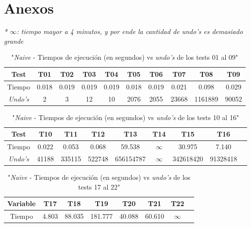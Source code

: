 \documentclass[12pt]{article}
\begin{document}
\section*{Anexos}

\textit{* $\infty$: tiempo mayor a 4 minutos, y por ende la cantidad de undo's es demasiado grande} \\

\begin{center}
    \begin{table}[h]
        \caption{"\textit{Naive} - Tiempos de ejecución (en segundos) vs \textit{undo's} de los tests 01 al 09"}
        \centering
        \begin{tabular} {| c | c | c | c | c | c | c | c | c | c |}
            \hline
            Test & T01 & T02 & T03 & T04 & T05 & T06 & T07 & T08 & T09 \\
            \hline
            Tiempo & 0.018 & 0.019 & 0.019 & 0.019 & 0.018 & 0.019 & 0.021 & 0.098 & 0.029 \\
            \textit{Undo's} & 2 & 3 & 12 & 10 & 2076 & 2055 & 23668 & 1161889 & 90052 \\
            \hline
        \end{tabular}
    \end{table}
    \begin{table}[h]
        \caption{"\textit{Naive} - Tiempos de ejecución (en segundos) vs \textit{undo's} de los tests 10 al 16"}
        \centering
        \begin{tabular} {| c | c | c | c | c | c | c | c | c |}
            \hline
            Test & T10 & T11 & T12 & T13 & T14 & T15 & T16 \\
            \hline
            Tiempo & 0.022 & 0.053 & 0.068 & 59.538 & $\infty$ & 30.975 & 7.140 \\
            \textit{Undo's} & 41188 & 335115 & 522748 & 656154787 & $\infty$ & 342618420 & 91328418 \\
            \hline
        \end{tabular}
    \end{table}
    \begin{table}[h]
        \caption{"\textit{Naive} - Tiempos de ejecución (en segundos) vs \textit{undo's} de los tests 17 al 22"}
        \centering
        \begin{tabular} {| c | c | c | c | c | c | c | c |}
            \hline
            Variable & T17 & T18 & T19 & T20 & T21 & T22 \\
            \hline
            Tiempo & 4.803 & 88.035 & 181.777 & 40.088 & 60.610 & $\infty$ \\

\end{tabular}
\end{table}
\end{center}
\end{document}
